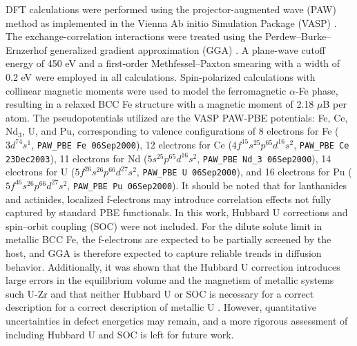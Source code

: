 \documentclass[preprint,12pt]{elsarticle}
\begin{document}
\noindent DFT calculations were performed using the projector-augmented wave (PAW) method as implemented in the Vienna Ab initio Simulation Package (VASP) \cite{kresse_ab_1993, kresse_efficient_1996}. The exchange-correlation interactions were treated using the Perdew--Burke--Ernzerhof generalized gradient approximation (GGA) \cite{perdew_generalized_1996}. A plane-wave cutoff energy of 450 eV and a first-order Methfessel--Paxton smearing with a width of 0.2 eV were employed \cite{methfessel_high-precision_1989} in all calculations. Spin-polarized calculations with collinear magnetic moments were used to model the ferromagnetic $\alpha$-Fe phase, resulting in a relaxed BCC Fe structure with a magnetic moment of 2.18 $\mu$B per atom. The pseudopotentials utilized are the VASP PAW-PBE potentials: Fe, Ce, Nd$_3$, U, and Pu, corresponding to valence configurations of 8 electrons for Fe ($3d^74s^1$, \texttt{PAW\_PBE Fe 06Sep2000}), 12 electrons for Ce ($4f^15s^25p^65d^16s^2$, \texttt{PAW\_PBE Ce 23Dec2003}), 11 electrons for Nd ($5s^25p^65d^16s^2$, \texttt{PAW\_PBE Nd\_3 06Sep2000}), 14 electrons for U ($5f^26s^26p^66d^27s^2$, \texttt{PAW\_PBE U 06Sep2000}), and 16 electrons for Pu ($5f^46s^26p^66d^27s^2$, \texttt{PAW\_PBE Pu 06Sep2000}).
It should be noted that for lanthanides and actinides, localized f-electrons may introduce correlation effects not fully captured by standard PBE functionals. In this work, Hubbard U corrections \cite{dudarev_effect_1997, cococcioni_linear_2005} and spin–orbit coupling (SOC) \cite{steiner_calculation_2016} were not included. For the dilute solute limit in metallic BCC Fe, the f-electrons are expected to be partially screened by the host, and GGA is therefore expected to capture reliable trends in diffusion behavior. Additionally, it was shown that the Hubbard U correction introduces large errors in the equilibrium volume and the magnetism of metallic systems such U-Zr \cite{soderlind_electron_2014, shousha_magnetism_2024} and that neither Hubbard U or SOC is necessary for a correct description for a correct description of metallic U \cite{soderlind_comment_2014}.
However, quantitative uncertainties in defect energetics may remain, and a more rigorous assessment of including Hubbard U and SOC is left for future work.
\end{document}
